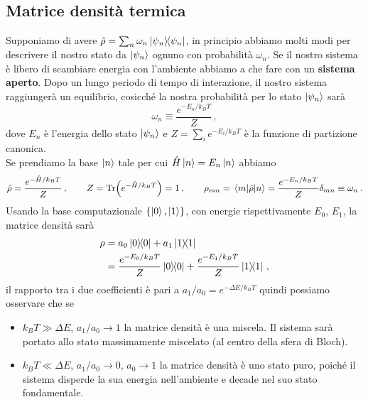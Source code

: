 \subsection{Matrice densità termica}
Supponiamo di avere $\hat \rho=\sum_n \omega_n \op{\psi_n}{\psi_n}$, in principio abbiamo molti modi per descrivere il nostro stato da $\ket{\psi_n}$ ognuno con probabilità $\omega_n$. Se il nostro sistema è libero di scambiare energia con l'ambiente abbiamo a che fare con un \textbf{sistema aperto}. Dopo un lungo periodo di tempo di interazione, il nostro sistema raggiungerà un equilibrio, cosicché la nostra probabilità per lo stato $\ket{\psi_n}$ sarà
\begin{equation*}
    \omega_n \equiv \frac{e^{-E_n/k_BT}}{Z} \, ,
\end{equation*}
dove $E_n$ è l'energia dello stato $\ket{\psi_n}$ e $Z=\sum_i e^{-E_i/k_BT}$ è la funzione di partizione canonica.\\
Se prendiamo la base $\ket n$ tale per cui $\hat H \ket n = E_n \ket n$ abbiamo
\begin{equation*}
    \hat \rho = \frac{e^{-\hat H/k_BT}}{Z}\, , \qquad Z=\Tr(e^{-\hat H/k_BT})=1\, , \qquad \rho_{mn}=\mel{m}{\hat \rho}{n}=\frac{e^{-E_n/k_BT}}{Z}\delta_{mn}\equiv \omega_n\, .
\end{equation*}
Usando la base computazionale $\{\ket 0, \ket 1\}$, con energie rispettivamente $E_0$, $E_1$, la matrice densità sarà
\begin{align*}
    \rho &= a_0 \op{0}{0} + a_1 \op{1}{1} \\
         &= \frac{e^{-E_0/k_BT}}{Z}\op{0}{0}+\frac{e^{-E_1/k_BT}}{Z}\op{1}{1}\, ,
\end{align*}
il rapporto tra i due coefficienti è pari a $a_1/a_0=e^{-\Delta E/k_BT}$ quindi possiamo osservare che se
\begin{itemize}
    \item $k_BT \gg \Delta E$, $a_1/a_0 \rightarrow 1$ la matrice densità è una miscela. Il sistema sarà portato allo stato massimamente miscelato (al centro della sfera di Bloch).
    \item $k_BT \ll \Delta E$, $a_1/a_0 \rightarrow 0$, $a_0 \rightarrow 1$ la matrice densità è uno stato puro, poiché il sistema disperde la sua energia nell'ambiente e decade nel suo stato fondamentale.
\end{itemize}
